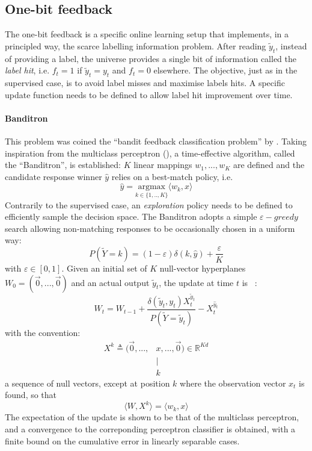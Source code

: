 \documentclass[preprint,12pt,authoryear]{elsarticle}
\begin{document}
\subsection{One-bit feedback}
The one-bit feedback is a specific online learning setup that implements, in a principled way, the scarce labelling information problem. After reading $\tilde{y}_t$, instead of providing a label, the universe provides a single bit of information called the \textit{label hit}, i.e. $f_t = 1$ if  $\tilde{y}_t=y_t$ and $f_t = 0$ elsewhere. The objective, just as in the supervised case, is to avoid label misses and maximise labels hits. A specific update function needs to be defined to allow label hit improvement over time. 

\paragraph{Banditron} This problem was coined the ``bandit feedback classification problem'' by \cite{kakade2008efficient}. Taking inspiration from the multiclass perceptron (\cite{duda1973pattern}), a time-effective algorithm, called the ``Banditron'', is established:
$K$ linear mappings $w_1, ..., w_K$ are defined and the candidate response winner $\hat{y}$ relies on a best-match policy, i.e.
\begin{equation}\label{eq:argmax}
\hat{y} = \underset{k \in\{1,..,K\}}{\text{argmax}}  \langle w_k, x \rangle
\end{equation}
Contrarily to the supervised case, an \textit{exploration} policy needs to be defined to efficiently sample the decision space. The Banditron adopts a simple  $\varepsilon-greedy$ search allowing  non-matching responses to be occasionally chosen in a uniform way:
\begin{equation}\label{eq:eps-greedy}
P(\tilde{Y}=k) = (1-\varepsilon) \delta(k,\hat{y}) + \frac{\varepsilon}{K}
\end{equation}
 with $\varepsilon \in [0,1]$.
Given an initial set of $K$ null-vector hyperplanes $W_0 = (\vec{0}, ..., \vec{0})$ and an actual output $\tilde{y}_t$, the update at time $t$ is ~:
\begin{equation} \label{eq:banditron-update}
W_t = W_{t-1} + \frac{\delta(\tilde{y}_t ,y_t) X_t^{\tilde{y}_t}}{P(\tilde{Y}=\tilde{y}_t)} - X_t^{\hat{y}_t}
\end{equation}   
with the convention:
\begin{align}\label{eq:X}
X^k \triangleq (\vec{0}, ..., & x, ..., \vec{0}) \in \mathbb{R}^{K d}\\
&\mid\nonumber\\
&k\nonumber
\end{align}
 a sequence of null vectors, except at position $k$ where the observation vector $x_t$ is found, so that 
 \begin{equation}\label{eq:simil-dot-product}
 \langle W, X^k\rangle = \langle w_k, x\rangle
 \end{equation}
The expectation of the update is shown to be that of the multiclass perceptron, and a convergence to the correponding perceptron classifier is obtained, with a finite bound on the cumulative error in linearly separable cases. 
\end{document}
